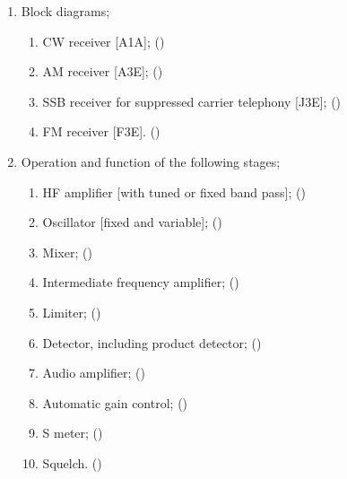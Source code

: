 \begin{flushleft}
\begin{enumerate}
\begin{enumerate}
\item Block diagrams;
\begin{enumerate}
\item CW receiver [A1A]; ()\label{HAREC.a.4.2.1}
\item AM receiver [A3E]; ()\label{HAREC.a.4.2.2}
\item SSB receiver for suppressed carrier telephony [J3E];
  ()\label{HAREC.a.4.2.3}
\item FM receiver [F3E]. ()\label{HAREC.a.4.2.4}
\end{enumerate}

\item Operation and function of the following stages;
\begin{enumerate}
\item HF amplifier [with tuned or fixed band pass];
  ()\label{HAREC.a.4.3.1}
\item Oscillator [fixed and variable];
  ()\label{HAREC.a.4.3.2}
\item Mixer; ()\label{HAREC.a.4.3.3}
\item Intermediate frequency amplifier;
  ()\label{HAREC.a.4.3.4}
\item Limiter; ()\label{HAREC.a.4.3.5}
\item Detector, including product detector;
  ()\label{HAREC.a.4.3.6}
\item Audio amplifier; ()\label{HAREC.a.4.3.7}
\item Automatic gain control; ()\label{HAREC.a.4.3.8}
\item S meter; ()\label{HAREC.a.4.3.9}
\item Squelch. ()\label{HAREC.a.4.3.10}
\end{enumerate}


\end{enumerate}
\end{enumerate}
\end{flushleft}
